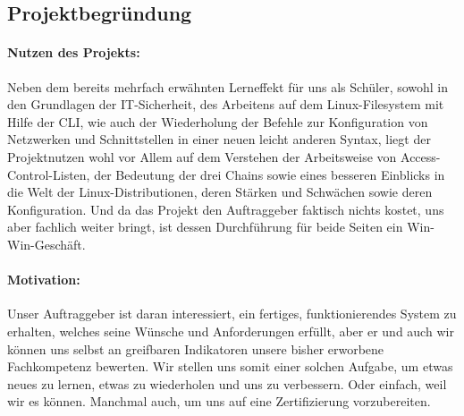 \subsection{Projektbegründung} 
\label{sec:Projektbegruendung}
\paragraph*{Nutzen des Projekts: } Neben dem bereits mehrfach erwähnten Lerneffekt für uns als Schüler, sowohl in den Grundlagen der \ac{IT}-Sicherheit, des Arbeitens auf dem Linux-Filesystem mit Hilfe der \ac{CLI}, wie auch der Wiederholung der Befehle zur Konfiguration von Netzwerken und Schnittstellen in einer neuen leicht anderen Syntax, liegt der Projektnutzen wohl vor Allem auf dem Verstehen der Arbeitsweise von Access-Control-Listen, der Bedeutung der drei Chains sowie eines besseren Einblicks in die Welt der Linux-Distributionen, deren Stärken und Schwächen sowie deren Konfiguration. Und da das Projekt den Auftraggeber faktisch nichts kostet, uns aber fachlich weiter bringt, ist dessen Durchführung für beide Seiten ein Win-Win-Geschäft.
\paragraph*{Motivation: } Unser Auftraggeber ist daran interessiert, ein fertiges, funktionierendes System zu erhalten, welches seine Wünsche und Anforderungen erfüllt, aber er und auch wir können uns selbst an greifbaren Indikatoren unsere bisher erworbene Fachkompetenz bewerten. Wir stellen uns somit einer solchen Aufgabe, um etwas neues zu lernen, etwas zu wiederholen und uns zu verbessern. Oder einfach, weil wir es können. Manchmal auch, um uns auf eine Zertifizierung vorzubereiten.

